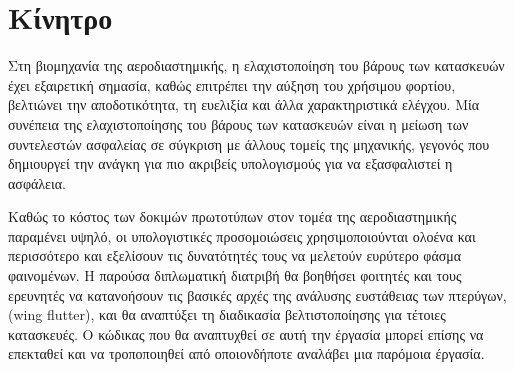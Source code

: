 \section{Κίνητρο}\label{motivation}

Στη βιομηχανία της αεροδιαστημικής, η ελαχιστοποίηση του βάρους των κατασκευών έχει εξαιρετική σημασία, καθώς επιτρέπει την αύξηση του χρήσιμου φορτίου, βελτιώνει την αποδοτικότητα, τη ευελιξία και άλλα χαρακτηριστικά ελέγχου. Μία συνέπεια της ελαχιστοποίησης του βάρους των κατασκευών είναι η μείωση των συντελεστών ασφαλείας σε σύγκριση με άλλους τομείς της μηχανικής, γεγονός που δημιουργεί την ανάγκη για πιο ακριβείς υπολογισμούς για να εξασφαλιστεί η ασφάλεια.

Καθώς το κόστος των δοκιμών πρωτοτύπων στον τομέα της αεροδιαστημικής παραμένει υψηλό, οι υπολογιστικές προσομοιώσεις χρησιμοποιούνται ολοένα και περισσότερο και εξελίσουν τις δυνατότητές τους να μελετούν ευρύτερο φάσμα φαινομένων. Η παρούσα διπλωματική διατριβή θα βοηθήσει φοιτητές και τους ερευνητές να κατανοήσουν τις βασικές αρχές της ανάλυσης ευστάθειας των πτερύγων, \textlatin{(wing flutter)}, και θα αναπτύξει τη διαδικασία βελτιστοποίησης για τέτοιες κατασκευές. Ο κώδικας που θα αναπτυχθεί σε αυτή την έργασία μπορεί επίσης να επεκταθεί και να τροποποιηθεί από οποιονδήποτε αναλάβει μια παρόμοια έργασία.
